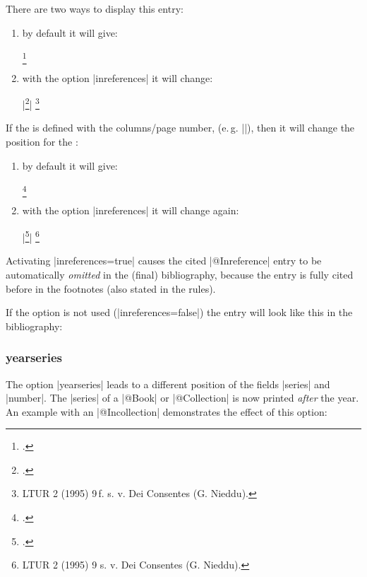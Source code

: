 \documentclass[a4paper,
10pt,
greek,
french,
spanish,
italian,
ngerman,
english
]{ltxdoc}
\begin{document}
There are two ways to display this entry:
 \begin{enumerate}
 \item by default it will give:  
 \begin{example}
\footnote{\cite{Nieddu1995}.}
 \end{example}
 \item with the option |inreferences| it will change:
 \begin{tcolorbox}[examplebox]
 |\footnote{\cite{Nieddu1995}.}|
 \tcblower
\footnote{LTUR 2 (1995) 9\,f. s. v. Dei Consentes (G. Nieddu).}
 \end{tcolorbox}
  \end{enumerate}

If the  is defined with the columns/page number, (e.\,g. |\cite[9]{Nieddu1995}|), 
then it will change the position for the :
\begin{enumerate} 
 \item by default it will give: 
 \begin{example}
\footnote{\cite[9]{Nieddu1995}.}
 \end{example}
 \item with the option |inreferences| it will change again:
  \begin{tcolorbox}[examplebox]
|\footnote{\cite[9]{Nieddu1995}.}|
 \tcblower
\footnote{LTUR 2 (1995) 9 s. v. Dei Consentes (G. Nieddu).}
 \end{tcolorbox}
  \end{enumerate}



\begin{marker}
    Activating |inreferences=true| causes the cited |@Inreference| entry to be automatically \emph{omitted} in the (final) bibliography,
because the entry is fully cited before in the footnotes (also stated in the \DAI rules).
\end{marker}

If the option is not used (|inreferences=false|) the entry will look like this in the bibliography:


\subsubsection{yearseries}\label{yearseries}
The option |yearseries| leads to a different position of the fields |series| and |number|.
The |series| of a |@Book| or |@Collection| is now printed \emph{after} the year.
An example with an |@Incollection| demonstrates the effect of this option:
 
\end{document}
